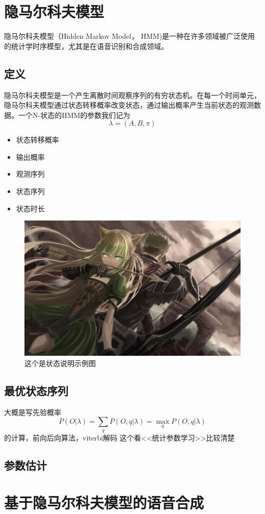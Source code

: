 \section{隐马尔科夫模型}
隐马尔科夫模型（Hidden Markov Model， HMM)是一种在许多领域被广泛使用的统计学时序模型，尤其是在语音识别和合成领域。

\subsection{定义}
隐马尔科夫模型是一个产生离散时间观察序列的有穷状态机。在每一个时间单元，隐马尔科夫模型通过状态转移概率改变状态，通过输出概率产生当前状态的观测数据。一个N-状态的HMM的参数我们记为 $$ \lambda = (A,B,\pi) $$
\begin{itemize}
	\item 状态转移概率
	\item 输出概率
	\item 观测序列
	\item 状态序列
	\item 状态时长
\end{itemize}

\begin{figure}
	\centering
	\includegraphics[width=.8\textwidth]{figures/test.jpg}
	\caption{这个是状态说明示例图}
\end{figure}
\subsection{最优状态序列}
大概是写先验概率 $$ P(O|\lambda)=\sum_{q}{P(O,q|\lambda)} = \max_{q}{P(O,q|\lambda)}$$
的计算，前向后向算法，viterbi解码
这个看<<统计参数学习>>比较清楚
\subsection{参数估计}

\section{基于隐马尔科夫模型的语音合成}
